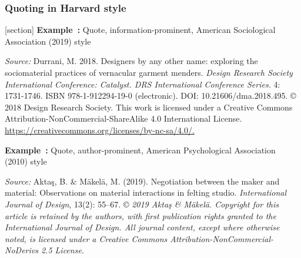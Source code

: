 \documentclass[english, 12pt, a4paper, sci, utf8, a-2b, online]{aaltothesis}
\begin{document}
\subsubsection*{Quoting in Harvard style}

[section]
\textsf{\textbf{Example~\theexample:}} Quote, information-prominent, American 
Sociological Association (2019) style

\vspace{1ex}
\noindent
{}

\vspace{1ex}
\noindent
\textit{Source:} Durrani, M. 2018. Designers by any other name: exploring the 
sociomaterial practices of vernacular garment menders. \textit{Design Research 
Society International Conference: Catalyst. DRS International Conference 
Series.} 4: 1731-1746. ISBN 978-1-912294-19-0 (electronic). 
DOI: 10.21606/dma.2018.495. \copyright{} 2018 Design Research Society. This work
is licensed under a Creative Commons Attribution-NonCommercial-ShareAlike 4.0 
International License. \url{https://creativecommons.org/licenses/by-nc-sa/4.0/.}

\vspace{1em}
\noindent
{}
\textsf{\textbf{Example~\theexample:}} Quote, author-prominent, American 
Psychological Association (2010) style

\vspace{1ex}
\noindent
{}

\vspace{1ex}
\noindent
\textit{Source:} Aktaş, B. \& Mäkelä, M. (2019). Negotiation between the maker 
and material: Observations on material interactions in felting studio. 
\textit{International Journal of Design}, 13(2): 55--67. \copyright{} 
\textit{2019 Aktaş \& Mäkelä. Copyright for this article is retained by the 
	authors, with first publication rights granted to the International Journal 
	of Design. All journal content, except where otherwise noted, is licensed 
	under a Creative Commons Attribution-NonCommercial-NoDerivs 2.5 License.}
\end{document}
